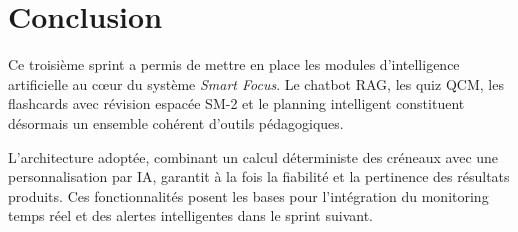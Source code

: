 
\section{Conclusion}

Ce troisième sprint a permis de mettre en place les modules d'intelligence artificielle au cœur du système \textit{Smart Focus}. Le chatbot RAG, les quiz QCM, les flashcards avec révision espacée SM-2 et le planning intelligent constituent désormais un ensemble cohérent d'outils pédagogiques.

L'architecture adoptée, combinant un calcul déterministe des créneaux avec une personnalisation par IA, garantit à la fois la fiabilité et la pertinence des résultats produits. Ces fonctionnalités posent les bases pour l'intégration du monitoring temps réel et des alertes intelligentes dans le sprint suivant.

